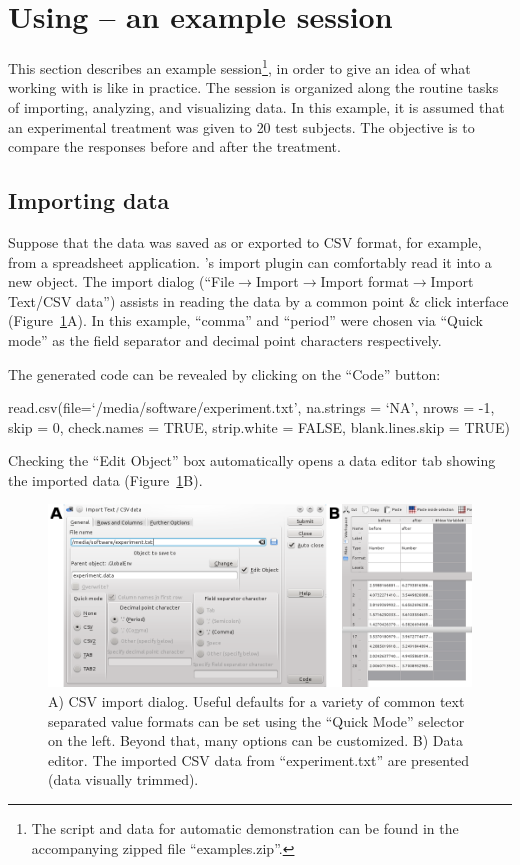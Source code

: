 \section[Using RKWard -- an example session]{Using  -- an example session}
\label{sec:using_RKWard}
This section describes an example  session\footnote{
    The  script and data for automatic demonstration can be found in the accompanying zipped file ``examples.zip''.
}, in order to give an idea
of what working with  is like in practice.
The session is organized along the routine tasks of importing,
analyzing, and visualizing data. In this example, it is assumed that an experimental
treatment was given to 20 test subjects. The objective is to compare the responses 
before and after the treatment. 

\subsection{Importing data}
\label{sec:importing_data}
Suppose that the data was saved as or exported to CSV format, for example, from a 
spreadsheet application. 's import plugin can
comfortably read it into a new  object.
The import dialog (``File$\rightarrow$Import$\rightarrow$Import
format$\rightarrow$Import Text/CSV data'') assists in reading the
data by a common point \& click interface (Figure~\ref{fig:import_data}A). In this
example, ``comma'' and ``period'' were chosen via ``Quick mode'' as the field
separator and decimal point characters respectively.

The generated  code can be revealed by clicking on the ``Code'' button:

\begin{Code}
read.csv(file=`/media/software/experiment.txt',
         na.strings = `NA', nrows = -1, skip = 0,
         check.names = TRUE, strip.white = FALSE, blank.lines.skip = TRUE)
\end{Code}

Checking the ``Edit Object'' box automatically opens a data editor tab
showing the imported data (Figure~\ref{fig:import_data}B).

\begin{figure}[b!]
 \centering
 \includegraphics[width=13.5cm]{./figures/import_data.png}
 \caption{A) CSV import dialog. Useful defaults for a variety of common text separated value formats can
  be set using the ``Quick Mode'' selector on the left. Beyond that, many options can be customized. B) Data editor. The imported CSV
  data from ``experiment.txt'' are presented (data visually trimmed).}
 \label{fig:import_data}
\end{figure}
\newpage
